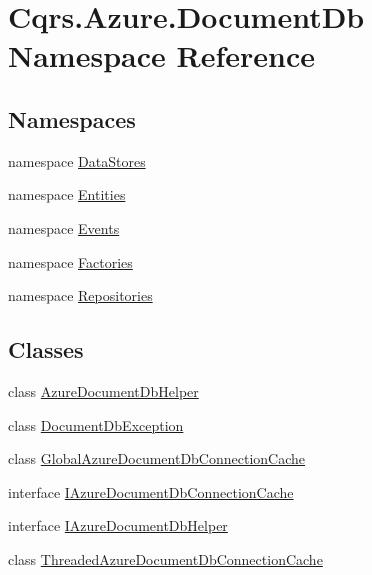 \hypertarget{namespaceCqrs_1_1Azure_1_1DocumentDb}{}\section{Cqrs.\+Azure.\+Document\+Db Namespace Reference}
\label{namespaceCqrs_1_1Azure_1_1DocumentDb}
\subsection*{Namespaces}
\begin{DoxyCompactItemize}
\item 
namespace \hyperlink{namespaceCqrs_1_1Azure_1_1DocumentDb_1_1DataStores}{Data\+Stores}
\item 
namespace \hyperlink{namespaceCqrs_1_1Azure_1_1DocumentDb_1_1Entities}{Entities}
\item 
namespace \hyperlink{namespaceCqrs_1_1Azure_1_1DocumentDb_1_1Events}{Events}
\item 
namespace \hyperlink{namespaceCqrs_1_1Azure_1_1DocumentDb_1_1Factories}{Factories}
\item 
namespace \hyperlink{namespaceCqrs_1_1Azure_1_1DocumentDb_1_1Repositories}{Repositories}
\end{DoxyCompactItemize}
\subsection*{Classes}
\begin{DoxyCompactItemize}
\item 
class \hyperlink{classCqrs_1_1Azure_1_1DocumentDb_1_1AzureDocumentDbHelper}{Azure\+Document\+Db\+Helper}
\item 
class \hyperlink{classCqrs_1_1Azure_1_1DocumentDb_1_1DocumentDbException}{Document\+Db\+Exception}
\item 
class \hyperlink{classCqrs_1_1Azure_1_1DocumentDb_1_1GlobalAzureDocumentDbConnectionCache}{Global\+Azure\+Document\+Db\+Connection\+Cache}
\item 
interface \hyperlink{interfaceCqrs_1_1Azure_1_1DocumentDb_1_1IAzureDocumentDbConnectionCache}{I\+Azure\+Document\+Db\+Connection\+Cache}
\item 
interface \hyperlink{interfaceCqrs_1_1Azure_1_1DocumentDb_1_1IAzureDocumentDbHelper}{I\+Azure\+Document\+Db\+Helper}
\item 
class \hyperlink{classCqrs_1_1Azure_1_1DocumentDb_1_1ThreadedAzureDocumentDbConnectionCache}{Threaded\+Azure\+Document\+Db\+Connection\+Cache}
\end{DoxyCompactItemize}
